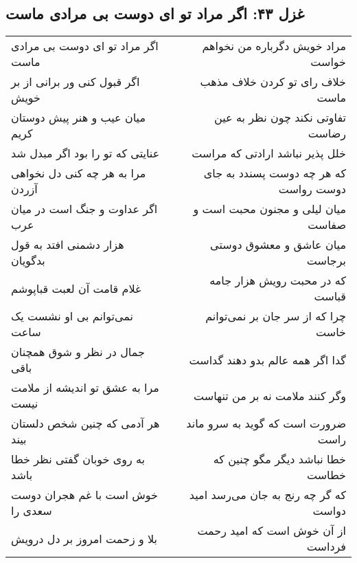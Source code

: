\begin{center}
\section*{غزل ۴۳: اگر مراد تو ای دوست بی مرادی ماست}
\label{sec:043}
\begin{longtable}{l p{0.5cm} r}
اگر مراد تو ای دوست بی مرادی ماست
&&
مراد خویش دگرباره من نخواهم خواست
\\
اگر قبول کنی ور برانی از بر خویش
&&
خلاف رای تو کردن خلاف مذهب ماست
\\
میان عیب و هنر پیش دوستان کریم
&&
تفاوتی نکند چون نظر به عین رضاست
\\
عنایتی که تو را بود اگر مبدل شد
&&
خلل پذیر نباشد ارادتی که مراست
\\
مرا به هر چه کنی دل نخواهی آزردن
&&
که هر چه دوست پسندد به جای دوست رواست
\\
اگر عداوت و جنگ است در میان عرب
&&
میان لیلی و مجنون محبت است و صفاست
\\
هزار دشمنی افتد به قول بدگویان
&&
میان عاشق و معشوق دوستی برجاست
\\
غلام قامت آن لعبت قباپوشم
&&
که در محبت رویش هزار جامه قباست
\\
نمی‌توانم بی او نشست یک ساعت
&&
چرا که از سر جان بر نمی‌توانم خاست
\\
جمال در نظر و شوق همچنان باقی
&&
گدا اگر همه عالم بدو دهند گداست
\\
مرا به عشق تو اندیشه از ملامت نیست
&&
وگر کنند ملامت نه بر من تنهاست
\\
هر آدمی که چنین شخص دلستان بیند
&&
ضرورت است که گوید به سرو ماند راست
\\
به روی خوبان گفتی نظر خطا باشد
&&
خطا نباشد دیگر مگو چنین که خطاست
\\
خوش است با غم هجران دوست سعدی را
&&
که گر چه رنج به جان می‌رسد امید دواست
\\
بلا و زحمت امروز بر دل درویش
&&
از آن خوش است که امید رحمت فرداست
\\
\end{longtable}
\end{center}
